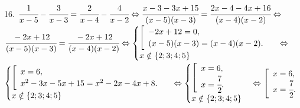 16. $\cfrac{1}{x-5}-\cfrac{3}{x-3}=\cfrac{2}{x-4}-\cfrac{4}{x-2} \Leftrightarrow \cfrac{x-3-3x+15}{(x-5)(x-3)}=\cfrac{2x-4-4x+16}{(x-4)(x-2)}\Leftrightarrow$\\$
\cfrac{-2x+12}{(x-5)(x-3)}=\cfrac{-2x+12}{(x-4)(x-2)}\Leftrightarrow \begin{cases} \left[\begin{array}{l}-2x+12=0,\\
(x-5)(x-3)=(x-4)(x-2).\end{array}\right.\\ x\notin\{2;3;4;5\}\end{cases}\Leftrightarrow$\\$ \begin{cases} \left[\begin{array}{l}x=6,\\
x^2-3x-5x+15=x^2-2x-4x+8.\end{array}\right.\\ x\notin\{2;3;4;5\}\end{cases}\Leftrightarrow \begin{cases} \left[\begin{array}{l}x=6,\\
x=\cfrac{7}{2}.\end{array}\right.\\ x\notin\{2;3;4;5\}\end{cases}\Leftrightarrow\left[\begin{array}{l}x=6,\\
x=\cfrac{7}{2}.\end{array}\right.$\\
